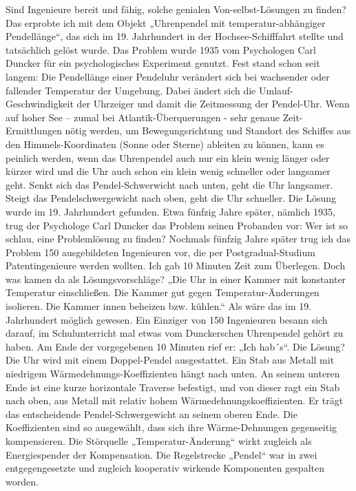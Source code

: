 \documentclass[12pt,a4paper]{article}
\begin{document}
Sind Ingenieure bereit und fähig, solche genialen Von-selbst-Lösungen zu finden? Das erprobte ich mit dem Objekt „Uhrenpendel mit temperatur-abhängiger Pendellänge“, das sich im 19. Jahrhundert in der Hochsee-Schifffahrt stellte und tatsächlich gelöst wurde. Das Problem wurde 1935 vom Psychologen Carl Duncker für ein psychologisches Experiment genutzt. Fest stand schon seit langem: Die Pendellänge einer Pendeluhr verändert sich bei wachsender oder fallender Temperatur der Umgebung. Dabei ändert sich die Umlauf-Geschwindigkeit der Uhrzeiger und damit die Zeitmessung der Pendel-Uhr. Wenn auf hoher See – zumal bei Atlantik-Überquerungen - sehr genaue Zeit-Ermittlungen nötig werden, um Bewegungsrichtung und Standort des Schiffes aus den Himmels-Koordinaten (Sonne oder Sterne) ableiten zu können, kann es peinlich werden, wenn das Uhrenpendel auch nur ein klein wenig länger oder kürzer wird und die Uhr auch schon ein klein wenig schneller oder langsamer geht. Senkt sich das Pendel-Schwerwicht nach unten, geht die Uhr langsamer. Steigt das Pendelschwergewicht nach oben, geht die Uhr schneller. Die Lösung wurde im 19. Jahrhundert gefunden. Etwa fünfzig Jahre später, nämlich 1935, trug der Psychologe Carl Duncker das Problem seinen Probanden vor: Wer ist so schlau, eine Problemlösung zu finden? Nochmals fünfzig Jahre später trug ich das Problem 150 ausgebildeten Ingenieuren vor, die per Postgradual-Studium Patentingenieure werden wollten. Ich gab 10 Minuten Zeit zum Überlegen. Doch was kamen da als Lösungsvorschläge? „Die Uhr in einer Kammer mit konstanter Temperatur einschließen. Die Kammer gut gegen Temperatur-Änderungen isolieren. Die Kammer innen beheizen bzw. kühlen.“ Als wäre das im 19. Jahrhundert möglich gewesen. Ein Einziger von 150 Ingenieuren besann sich darauf, im Schulunterricht mal etwas vom Dunckerschen Uhrenpendel gehört zu haben. Am Ende der vorgegebenen 10 Minuten rief er: „Ich hab´s“. Die Lösung? Die Uhr wird mit einem Doppel-Pendel ausgestattet. Ein Stab aus Metall mit niedrigem Wärmedehnungs-Koeffizienten hängt nach unten. An seinem unteren Ende ist eine kurze horizontale Traverse befestigt, und von dieser ragt ein Stab nach oben, aus Metall mit relativ hohem Wärmedehnungskoeffizienten. Er trägt das entscheidende Pendel-Schwergewicht an seinem oberen Ende. Die Koeffizienten sind so ausgewählt, dass sich ihre Wärme-Dehnungen gegenseitig kompensieren. Die Störquelle „Temperatur-Änderung“ wirkt zugleich als Energiespender der Kompensation. Die Regelstrecke „Pendel“ war in zwei entgegengesetzte und zugleich kooperativ wirkende Komponenten gespalten worden.
\end{document}

